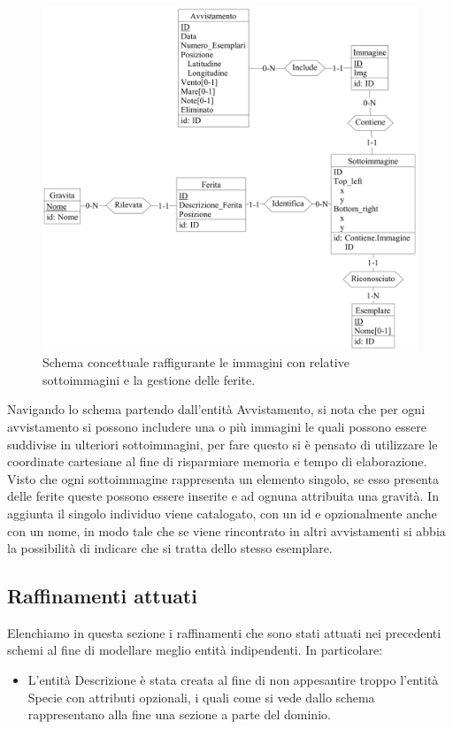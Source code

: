 \documentclass[a4paper,final,12pt]{report}
\begin{document}
\begin{figure}[hbtp]
\centering
\includegraphics[scale=0.13]{img_concettuale/avvistamento3.png}
\caption{Schema concettuale raffigurante le immagini con relative sottoimmagini e la gestione delle ferite.}
\end{figure}

Navigando lo schema partendo dall'entità Avvistamento, si nota che per ogni avvistamento si possono includere una o più immagini le quali possono essere suddivise in ulteriori sottoimmagini, per fare questo si è pensato di utilizzare le coordinate cartesiane al fine di risparmiare memoria e tempo di elaborazione. Visto che ogni sottoimmagine rappresenta un elemento singolo, se esso presenta delle ferite queste possono essere inserite e ad ognuna attribuita una gravità. In aggiunta il singolo individuo viene catalogato, con un id e opzionalmente anche con un nome, in modo tale che se viene rincontrato in altri avvistamenti si abbia la possibilità di indicare che si tratta dello stesso esemplare.

\subsection{Raffinamenti attuati}
Elenchiamo in questa sezione i raffinamenti che sono stati attuati nei precedenti schemi al fine di modellare meglio entità indipendenti. In particolare:
\begin{itemize}
\item L'entità Descrizione è stata creata al fine di non appesantire troppo l'entità Specie con attributi opzionali, i quali come si vede dallo schema rappresentano alla fine una sezione a parte del dominio. 
\end{itemize}
\end{document}

